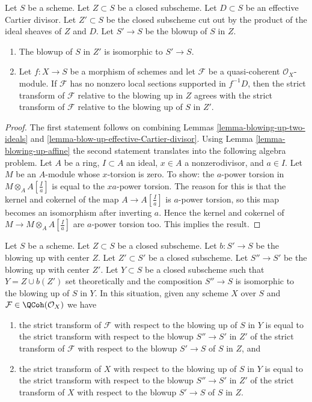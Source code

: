 \begin{lemma}
\label{lemma-strict-transform-different-centers}
Let $S$ be a scheme. Let $Z \subset S$ be a closed subscheme.
Let $D \subset S$ be an effective Cartier divisor.
Let $Z' \subset S$ be the closed subscheme cut out by the product
of the ideal sheaves of $Z$ and $D$.
Let $S' \to S$ be the blowup of $S$ in $Z$.
\begin{enumerate}
\item The blowup of $S$ in $Z'$ is isomorphic to $S' \to S$.
\item Let $f : X \to S$ be a morphism of schemes and let $\mathcal{F}$
be a quasi-coherent $\mathcal{O}_X$-module. If $\mathcal{F}$ has
no nonzero local sections supported in $f^{-1}D$, then the
strict transform of $\mathcal{F}$ relative to the blowing up
in $Z$ agrees with the strict transform of $\mathcal{F}$ relative
to the blowing up of $S$ in $Z'$.
\end{enumerate}
\end{lemma}

\begin{proof}
The first statement follows on combining
Lemmas \ref{lemma-blowing-up-two-ideals} and
\ref{lemma-blow-up-effective-Cartier-divisor}.
Using Lemma \ref{lemma-blowing-up-affine} the second statement
translates into the
following algebra problem. Let $A$ be a ring, $I \subset A$ an ideal,
$x \in A$ a nonzerodivisor, and $a \in I$. Let $M$ be an $A$-module
whose $x$-torsion is zero. To show: the $a$-power torsion in
$M \otimes_A A[\frac{I}{a}]$ is equal to the $xa$-power torsion.
The reason for this is that the kernel and cokernel of the map
$A \to A[\frac{I}{a}]$ is $a$-power torsion, so this map becomes an
isomorphism after inverting $a$. Hence the kernel
and cokernel of $M \to M \otimes_A A[\frac{I}{a}]$ are $a$-power
torsion too. This implies the result.
\end{proof}

\begin{lemma}
\label{lemma-strict-transform-composition-blowups}
Let $S$ be a scheme. Let $Z \subset S$ be a closed subscheme.
Let $b : S' \to S$ be the blowing up with center $Z$. Let $Z' \subset S'$ be
a closed subscheme. Let $S'' \to S'$ be the blowing up with center $Z'$.
Let $Y \subset S$ be a closed subscheme such that
$Y = Z \cup b(Z')$ set theoretically and the composition $S'' \to S$
is isomorphic to the blowing up of $S$ in $Y$.
In this situation, given any scheme $X$ over $S$ and
$\mathcal{F} \in \QCoh(\mathcal{O}_X)$ we have
\begin{enumerate}
\item the strict transform of $\mathcal{F}$ with respect to the blowing
up of $S$ in $Y$ is equal to the strict transform with respect to the
blowup $S'' \to S'$ in $Z'$ of the strict transform of $\mathcal{F}$
with respect to the blowup $S' \to S$ of $S$ in $Z$, and
\item the strict transform of $X$ with respect to the blowing
up of $S$ in $Y$ is equal to the strict transform with respect to the
blowup $S'' \to S'$ in $Z'$ of the strict transform of $X$
with respect to the blowup $S' \to S$ of $S$ in $Z$.
\end{enumerate}
\end{lemma}

